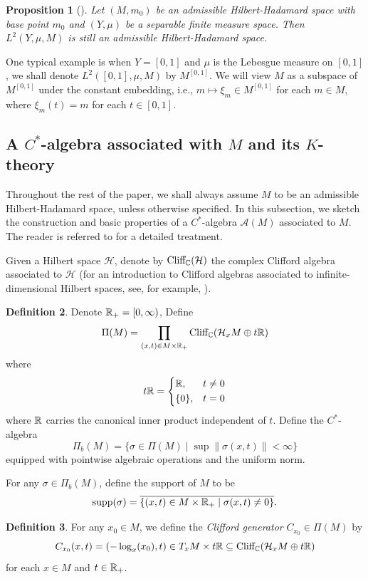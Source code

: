 \documentclass[11pt]{article}
\theoremstyle{definition}
\newtheorem{Def}{Definition}[section]
\theoremstyle{plain}
\newtheorem{Pro}[Def]{Proposition}
\def\A{\mathcal A}\def\C{\mathcal C}\def\B{\mathcal B}\def\E{\mathcal E}\def\O{\mathcal O}\def\h{\mathfrak h}\def\K{\mathcal K}\def\F{\mathcal F}\def\P{\mathcal P}\def\L{\mathcal L}\def\R{\mathcal R}\def\Q{\mathcal Q}\def\H{\mathcal H}\def\S{\mathcal S}\def\N{\mathcal N}\def\U{\mathcal U}\def\V{\mathcal V}
\def\supp{\textup{supp}}
\def\Cl{\textup{Cliff}_{\IC}}
\begin{document}
\begin{Pro}[\cite{GWY2018}]
Let $(M,m_0)$ be an admissible Hilbert-Hadamard space with base point $m_0$ and $(Y,\mu)$ be a separable finite measure space. Then $L^2(Y,\mu, M)$ is still an admissible Hilbert-Hadamard space.
\end{Pro}

One typical example is when $Y=[0,1]$ and $\mu$ is the Lebesgue measure on $[0,1]$, we shall denote $L^2([0,1],\mu,M)$ by $M^{[0,1]}$. We will view $M$ as a subspace of $M^{[0,1]}$ under the constant embedding, i.e., $m\mapsto \xi_m\in M^{[0,1]}$ for each $m\in M$, where $\xi_m(t)=m$ for each $t\in[0,1]$.

\subsection{A $C^*$-algebra associated with $M$ and its $K$-theory}

Throughout the rest of the paper, we shall always assume $M$ to be an admissible Hilbert-Hadamard space, unless otherwise specified. In this subsection, we sketch the construction and basic properties of a $C^*$-algebra $\A(M)$ associated to $M$. The reader is referred to \cite[Sections~5-7]{GWY2018} for a detailed treatment.

Given a Hilbert space $\H$, denote by $\Cl(\H)$ the complex Clifford algebra associated to $\H$ (for an introduction to Clifford algebras associated to infinite-dimensional Hilbert spaces, see, for example, \cite[Section~3.1]{GLWZ2022}). 
\begin{Def}\label{def:Pi-alg}
Denote $\mathbb R_+=[0,\infty)$, Define
$$\Pi(M)=\prod_{(x,t)\in M\times\IR_+}\Cl(\H_xM\oplus t\IR)$$
where
$$t\mathbb R=\left\{\begin{aligned}&\mathbb R,&&t\ne0\\&\{0\},&&t=0\end{aligned}\right.$$
where $\mathbb R$ carries the canonical inner product independent of $t$. Define the $C^*$-algebra
$$\Pi_b(M)=\{\sigma\in\Pi(M)\mid \sup\|\sigma(x,t)\|<\infty\}$$
equipped with pointwise algebraic operations and the uniform norm.
\end{Def}

For any $\sigma\in\Pi_b(M)$, define the support of $M$ to be
$$\supp(\sigma)=\overline{\{(x,t)\in M\times\IR_+\mid \sigma(x,t)\ne 0\}}.$$

\begin{Def}\label{def:Clifford_generator}
For any $x_0\in M$, we define the \emph{Clifford generator} $C_{x_0}\in\Pi(M)$ by
$$C_{x_0}(x,t)=(-\log_x(x_0),t)\in T_xM\times t\IR\subseteq \Cl(\H_xM\oplus t\IR)$$
for each $x\in M$ and $t\in\mathbb R_+$.
\end{Def}
\end{document}
